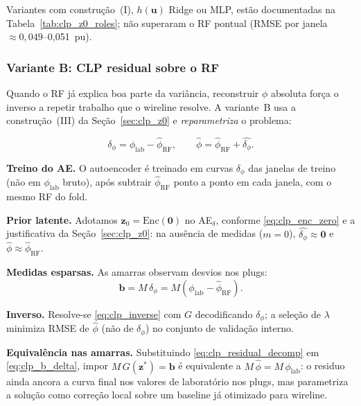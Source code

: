 \documentclass[11pt,a4paper]{article}
\newcommand{\deltaphi}{\ensuremath{\delta_{\phi}}}
\newcommand{\zvec}{\ensuremath{\mathbf{z}}}
\newcommand{\zzero}{\ensuremath{\mathbf{z}_0}}
\begin{document}
Variantes com construção~(I), $h(\mathbf{u})$ Ridge ou MLP, estão
documentadas na Tabela~\ref{tab:clp_z0_roles}; não superaram o RF
pontual (RMSE por janela $\approx 0{,}049$--0,051~pu).

\subsubsection{Variante B: CLP residual sobre o RF}

Quando o RF já explica boa parte da variância, reconstruir $\phi$
absoluta força o inverso a repetir trabalho que o wireline resolve.
A variante~B usa a construção~(III) da
Seção~\ref{sec:clp_z0} e \emph{reparametriza} o problema:

\begin{equation}
  \deltaphi
  =
  \phi_{\mathrm{lab}} - \widehat{\phi}_{\mathrm{RF}},
  \qquad
  \widehat{\phi}
  =
  \widehat{\phi}_{\mathrm{RF}} + \widehat{\deltaphi}.
  \label{eq:clp_residual_decomp}
\end{equation}

\textbf{Treino do AE.}
O autoencoder é treinado em curvas $\deltaphi$ das janelas de treino
(não em $\phi_{\mathrm{lab}}$ bruto), após subtrair
$\widehat{\phi}_{\mathrm{RF}}$ ponto a ponto em cada janela, com o
mesmo RF do fold.

\textbf{Prior latente.}
Adotamos $\zzero=\mathrm{Enc}(\mathbf{0})$ no AE$_{\delta}$, conforme
\eqref{eq:clp_enc_zero} e a justificativa da
Seção~\ref{sec:clp_z0}: na ausência de medidas ($m=0$),
$\widehat{\deltaphi}\approx\mathbf{0}$ e
$\widehat{\phi}\approx\widehat{\phi}_{\mathrm{RF}}$.

\textbf{Medidas esparsas.}
As amarras observam desvios nos plugs:
\begin{equation}
  \mathbf{b}
  =
  M\,\deltaphi
  =
  M\!\left(\phi_{\mathrm{lab}}-\widehat{\phi}_{\mathrm{RF}}\right).
  \label{eq:clp_b_delta}
\end{equation}

\textbf{Inverso.}
Resolve-se \eqref{eq:clp_inverse} com $G$ decodificando $\deltaphi$;
a seleção de $\lambda$ minimiza RMSE de $\widehat{\phi}$ (não de
$\deltaphi$) no conjunto de validação interno.

\textbf{Equivalência nas amarras.}
Substituindo \eqref{eq:clp_residual_decomp} em \eqref{eq:clp_b_delta},
impor $M\,G(\zvec^{\ast})=\mathbf{b}$ é equivalente a
$M\,\widehat{\phi}=M\,\phi_{\mathrm{lab}}$: o residuo ainda ancora a
curva final nos valores de laboratório nos plugs, mas parametriza a
solução como correção local sobre um baseline já otimizado para wireline.
\end{document}
